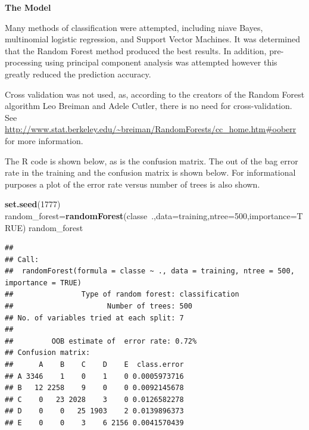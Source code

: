 \documentclass[]{article}
\newenvironment{Shaded}{\begin{snugshade}}{\end{snugshade}}
\newcommand{\KeywordTok}[1]{\textcolor[rgb]{0.13,0.29,0.53}{\textbf{{#1}}}}
\newcommand{\DataTypeTok}[1]{\textcolor[rgb]{0.13,0.29,0.53}{{#1}}}
\newcommand{\DecValTok}[1]{\textcolor[rgb]{0.00,0.00,0.81}{{#1}}}
\newcommand{\FloatTok}[1]{\textcolor[rgb]{0.00,0.00,0.81}{{#1}}}
\newcommand{\StringTok}[1]{\textcolor[rgb]{0.31,0.60,0.02}{{#1}}}
\newcommand{\CommentTok}[1]{\textcolor[rgb]{0.56,0.35,0.01}{\textit{{#1}}}}
\newcommand{\OtherTok}[1]{\textcolor[rgb]{0.56,0.35,0.01}{{#1}}}
\newcommand{\NormalTok}[1]{{#1}}
\begin{document}
\begin{Shaded}
\end{Shaded}

\textbf{The Model}

Many methods of classification were attempted, including niave Bayes,
multinomial logistic regression, and Support Vector Machines. It was
determined that the Random Forest method produced the best results. In
addition, pre-processing using principal component analysis was
attempted however this greatly reduced the prediction accuracy.

Cross validation was not used, as, according to the creators of the
Random Forest algorithm Leo Breiman and Adele Cutler, there is no need
for cross-validation. See
\url{http://www.stat.berkeley.edu/~breiman/RandomForests/cc_home.htm\#ooberr}
for more information.

The R code is shown below, as is the confusion matrix. The out of the
bag error rate in the training and the confusion matrix is shown below.
For informational purposes a plot of the error rate versus number of
trees is also shown.

\begin{Shaded}
\begin{Highlighting}[]
\KeywordTok{set.seed}\NormalTok{(}\DecValTok{1777}\NormalTok{)}
\NormalTok{random_forest=}\KeywordTok{randomForest}\NormalTok{(classe~.,}\DataTypeTok{data=}\NormalTok{training,}\DataTypeTok{ntree=}\DecValTok{500}\NormalTok{,}\DataTypeTok{importance=}\OtherTok{TRUE}\NormalTok{)}
\NormalTok{random_forest}
\end{Highlighting}
\end{Shaded}

\begin{verbatim}
## 
## Call:
##  randomForest(formula = classe ~ ., data = training, ntree = 500,      importance = TRUE) 
##                Type of random forest: classification
##                      Number of trees: 500
## No. of variables tried at each split: 7
## 
##         OOB estimate of  error rate: 0.72%
## Confusion matrix:
##      A    B    C    D    E  class.error
## A 3346    1    0    1    0 0.0005973716
## B   12 2258    9    0    0 0.0092145678
## C    0   23 2028    3    0 0.0126582278
## D    0    0   25 1903    2 0.0139896373
## E    0    0    3    6 2156 0.0041570439
\end{verbatim}
\end{document}
